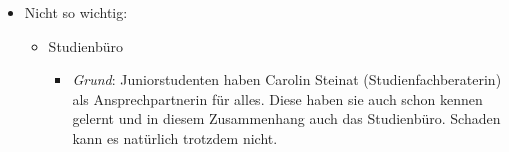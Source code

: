 \documentclass[a4paper,11pt]{scrartcl} %
\newenvironment{myitemize}{\begin{itemize}\itemsep -2pt}{\end{itemize}} %
\begin{document}
\begin{myitemize}
\begin{myitemize}
\begin{myitemize}
				\end{myitemize}
			\item Lernen lernen
				\begin{myitemize}
					\item \textit{Grund}: Lernen an der Uni funktioniert anders als in der Schule. Es ist wichtig dies einmal in einem ungezwungenen Umfeld üben zu können. Keine Angst, alle anderen haben genau so wenig Vorerfahrung mit dem Stoff!
				\end{myitemize}
			\item Studienberatung 2
				\begin{myitemize}
					\item \textit{Grund}: Extra für Juniorstudenten (siehe unten)
				\end{myitemize}
			\item Rallye
				\begin{myitemize}
					\item \textit{Grund}: Vorlesungen werden auch für Juniorstudenten am Hauptcampus stattfinden, daher sollte man sich dort auskennen. Außerdem macht es Spaß!
				\end{myitemize}
			\item Verantwortung (heißt im Stundenplan anders)
		\end{myitemize}
	\item Nicht so wichtig:
		\begin{myitemize}
			\item Studienbüro
				\begin{myitemize}
					\item \textit{Grund}: Juniorstudenten haben Carolin Steinat (Studienfachberaterin) als Ansprechpartnerin für alles. Diese haben sie auch schon kennen gelernt und in diesem Zusammenhang auch das Studienbüro. Schaden kann es natürlich trotzdem nicht.
				\end{myitemize}
			

\end{myitemize}
\end{myitemize}
\end{document}
